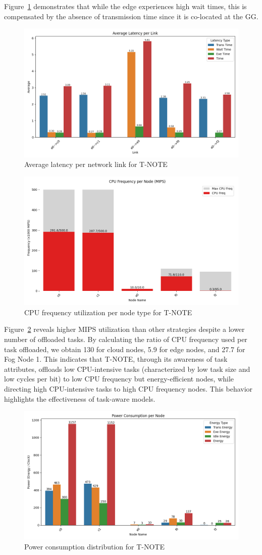 \documentclass[preprint,3p,authoryear]{elsarticle}
\begin{document}
Figure~\ref{fig:T-NOTE-avg-latency} demonstrates that while the edge experiences high wait times, this is compensated by the absence of transmission time since it is co-located at the GG.

\begin{figure}[H]
    \centering
    \includegraphics[width=0.5\linewidth]{figs/T-NOTE/avg_latency_per_link.png}
    \caption{Average latency per network link for T-NOTE}
    \label{fig:T-NOTE-avg-latency}
\end{figure}

\begin{figure}[H]
    \centering
    \includegraphics[width=0.5\linewidth]{figs/T-NOTE/cpu_frequency_per_node.png}
    \caption{CPU frequency utilization per node type for T-NOTE}
    \label{fig:T-NOTE-cpu-frequency}
\end{figure}

Figure~\ref{fig:T-NOTE-cpu-frequency} reveals higher MIPS utilization than other strategies despite a lower number of offloaded tasks. By calculating the ratio of CPU frequency used per task offloaded, we obtain 130 for cloud nodes, 5.9 for edge nodes, and 27.7 for Fog Node 1. This indicates that T-NOTE, through its awareness of task attributes, offloads low CPU-intensive tasks (characterized by low task size and low cycles per bit) to low CPU frequency but energy-efficient nodes, while directing high CPU-intensive tasks to high CPU frequency nodes. This behavior highlights the effectiveness of task-aware models.

\begin{figure}[H]
    \centering
    \includegraphics[width=0.5\linewidth]{figs/T-NOTE/power_consumption_per_node.png}
    \caption{Power consumption distribution for T-NOTE}
    \label{fig:T-NOTE-power-consumption}
\end{figure}
\end{document}
